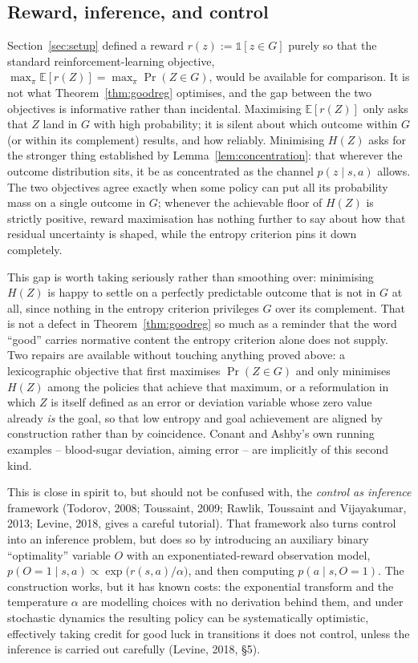 \documentclass[11pt]{article}
\theoremstyle{definition}
\theoremstyle{remark}
\begin{document}
\subsection*{Reward, inference, and control}

Section~\ref{sec:setup} defined a reward $r(z):=\mathbb{1}[z\in G]$ purely
so that the standard reinforcement-learning objective,
$\max_\pi\mathbb{E}[r(Z)]=\max_\pi\Pr(Z\in G)$, would be available for
comparison. It is not what Theorem~\ref{thm:goodreg} optimises, and the
gap between the two objectives is informative rather than incidental.
Maximising $\mathbb{E}[r(Z)]$ only asks that $Z$ land in $G$ with high
probability; it is silent about which outcome within $G$ (or within its
complement) results, and how reliably. Minimising $H(Z)$ asks for the
stronger thing established by Lemma~\ref{lem:concentration}: that wherever
the outcome distribution sits, it be as concentrated as the channel
$p(z\mid s,a)$ allows. The two objectives agree exactly when some policy
can put all its probability mass on a single outcome in $G$; whenever the
achievable floor of $H(Z)$ is strictly positive, reward maximisation has
nothing further to say about how that residual uncertainty is shaped,
while the entropy criterion pins it down completely.

This gap is worth taking seriously rather than smoothing over: minimising
$H(Z)$ is happy to settle on a perfectly predictable outcome that is not
in $G$ at all, since nothing in the entropy criterion privileges $G$ over
its complement. That is not a defect in Theorem~\ref{thm:goodreg} so much
as a reminder that the word ``good'' carries normative content the entropy
criterion alone does not supply. Two repairs are available without
touching anything proved above: a lexicographic objective that first
maximises $\Pr(Z\in G)$ and only minimises $H(Z)$ among the policies that
achieve that maximum, or a reformulation in which $Z$ is itself defined as
an error or deviation variable whose zero value already \emph{is} the
goal, so that low entropy and goal achievement are aligned by construction
rather than by coincidence. Conant and Ashby's own running examples --
blood-sugar deviation, aiming error -- are implicitly of this second kind.

This is close in spirit to, but should not be confused with, the
\emph{control as inference} framework (Todorov, 2008; Toussaint, 2009;
Rawlik, Toussaint and Vijayakumar, 2013; Levine, 2018, gives a careful
tutorial). That framework also turns control into an inference problem,
but does so by introducing an auxiliary binary ``optimality'' variable $O$
with an exponentiated-reward observation model,
$p(O=1\mid s,a)\propto\exp\!\big(r(s,a)/\alpha\big)$, and then computing
$p(a\mid s, O=1)$. The construction works, but it has known costs: the
exponential transform and the temperature $\alpha$ are modelling choices
with no derivation behind them, and under stochastic dynamics the
resulting policy can be systematically optimistic, effectively taking
credit for good luck in transitions it does not control, unless the
inference is carried out carefully (Levine, 2018, \S5).
\end{document}
